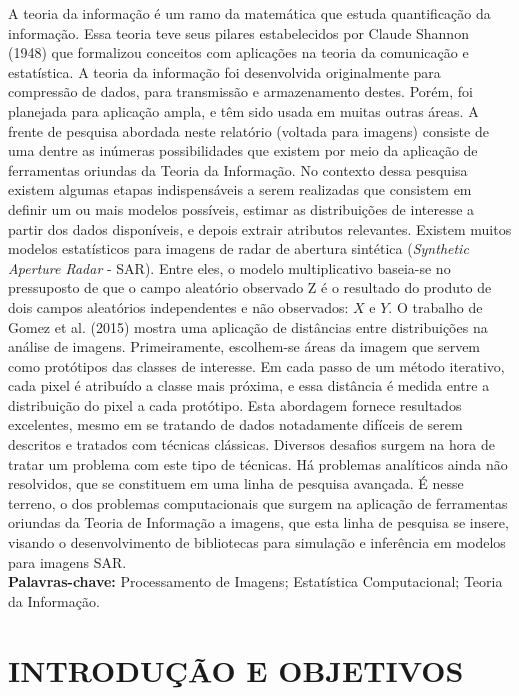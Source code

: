 \documentclass[12pt,letterpaper]{article}
\begin{document}
	A teoria da informação é um ramo da matemática que estuda quantificação da informação. Essa teoria teve seus pilares estabelecidos por Claude Shannon (1948) que formalizou conceitos com aplicações na teoria da comunicação e estatística. A teoria da informação foi desenvolvida originalmente para compressão de dados, para transmissão e armazenamento destes. Porém, foi planejada para aplicação ampla, e têm sido usada em muitas outras áreas. A frente de pesquisa abordada neste relatório (voltada para imagens) consiste de uma dentre as inúmeras possibilidades que existem por meio da aplicação de ferramentas oriundas da Teoria da Informação. No contexto dessa pesquisa existem algumas etapas indispensáveis a serem realizadas que consistem em definir um ou mais modelos possíveis, estimar as distribuições de interesse a partir dos dados disponíveis, e depois extrair atributos relevantes. Existem muitos modelos estatísticos para imagens de radar de abertura sintética (\textit{Synthetic Aperture Radar} - SAR). Entre eles, o modelo multiplicativo baseia-se no pressuposto de que o campo aleatório observado Z é o resultado do produto de dois campos aleatórios independentes e não observados: $X$ e $Y$\cite{ClassificationSARImages}. O trabalho de Gomez et al. (2015)\cite{Gomez} mostra uma aplicação de distâncias entre distribuições na análise de imagens. Primeiramente, escolhem-se áreas da imagem que servem como protótipos das classes de interesse. Em cada passo de um método iterativo, cada pixel é atribuído a classe mais próxima, e essa distância é medida entre a distribuição do pixel a cada protótipo. Esta abordagem fornece resultados excelentes, mesmo em se tratando de dados notadamente difíceis de serem descritos e tratados com técnicas clássicas. Diversos desafios surgem na hora de tratar um problema com este tipo de técnicas. Há problemas analíticos ainda não resolvidos, que se constituem em uma linha de pesquisa avançada. É nesse terreno, o dos problemas computacionais que surgem na aplicação de ferramentas oriundas da Teoria de Informação a imagens, que esta linha de pesquisa se insere, visando o desenvolvimento de bibliotecas para simulação e inferência em modelos para imagens SAR.\\

\textbf{Palavras-chave:} Processamento de Imagens; Estatística Computacional; Teoria da Informação.


\newpage
\section*{\centering \textbf{INTRODUÇÃO E OBJETIVOS}} %
\end{document}
